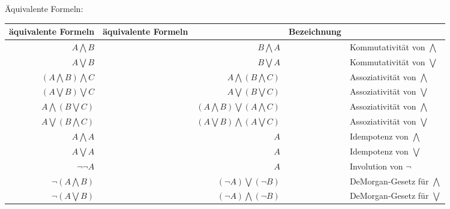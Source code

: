 \documentclass[diskretestrukturen.tex]{subfiles}
\begin{document}
\begin{description}
    \"Aquivalente Formeln:
    \begin{tabular}{r|rr}
      \hline
      \"aquivalente Formeln & \"aquivalente Formeln && Bezeichnung  \\
      \hline
      $A \bigwedge B$ && $B \bigwedge A$ && Kommutativit\"at von $\bigwedge$  \\
      $A \bigvee B$ && $B \bigvee A$ && Kommutativit\"at von $\bigvee$  \\

      $(A \bigwedge B) \bigwedge C$ && $A \bigwedge (B \bigwedge C)$ && Assoziativit\"at von $\bigwedge$  \\
      $(A \bigvee B) \bigvee C$ && $A \bigvee (B \bigvee C)$ && Assoziativit\"at von $\bigvee$  \\

      $A \bigwedge (B \bigvee C)$ && $(A \bigwedge B) \bigvee (A \bigwedge C)$ && Assoziativit\"at von $\bigwedge$  \\
      $A \bigvee (B \bigwedge C)$ && $(A \bigvee B) \bigwedge (A \bigvee C)$ && Assoziativit\"at von $\bigvee$  \\

      $A \bigwedge A$ && $A$ && Idempotenz von $\bigwedge$  \\
      $A \bigvee A$ && $A$ && Idempotenz von $\bigvee$  \\

      $\neg\neg A$ && $A$ && Involution von $\neg$  \\

      $\neg(A \bigwedge B)$ && $(\neg A) \bigvee (\neg B)$ && DeMorgan-Gesetz f\"ur $\bigwedge$  \\
      $\neg(A \bigvee B)$ && $(\neg A) \bigwedge (\neg B)$ && DeMorgan-Gesetz f\"ur $\bigvee$  \\
      \hline
    \end{tabular}
  \end{description}
\end{document}
